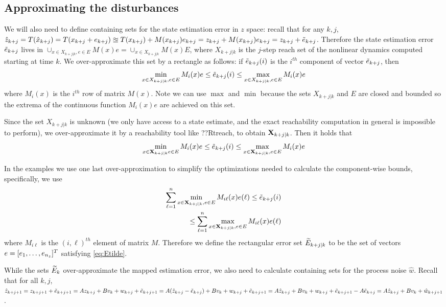 \subsection{Approximating the  disturbances}
\label{sec:approx dist}
We will also need to define containing sets for the state estimation error in $z$ space:
recall that for any $k,j$, 
$\hat{z}_{k+j} = T(\hat{x}_{k+j}) = T(x_{k+j} + e_{k+j}) \approxeq T(x_{k+j}) + M(x_{k+j})e_{k+j} = z_{k+j} + M(x_{k+j})e_{k+j} = z_{k+j} + \tilde{e}_{{k+j}}$.
Therefore the state estimation error $\tilde{e}_{k+j}$ lives in 
$\cup_{x\in X_{k+j|k}, e \in E}M(x)e = \cup_{x \in X_{k+j|k}}M(x)E$, 
where $X_{k+j|k}$ is the $j$-step reach set of the nonlinear dynamics computed starting at time $k$.
%
We over-approximate this set by a rectangle as follows: 
if $\tilde{e}_{k+j}(i)$ is the $i^{th}$ component of vector $\tilde{e}_{k+j}$, then 
\[\min_{x \in X_{k+j|k}, e \in E}M_i(x)e \leq \tilde{e}_{k+j}(i) \leq \max_{x \in X_{k+j|k}, e \in E} M_i(x)e\]
where $M_i(x)$ is the $i^{th}$ row of matrix $M(x)$.
Note we can use $\max$ and $\min$ because the sets $X_{k+j|k}$ and $E$ are closed and bounded so the extrema of the continuous function $M_i(x)e$ are achieved on this set.

Since the set $X_{k+j|k}$ is unknown (we only have access to a state estimate, and the exact reachability computation in general is impossible to perform), we over-approximate it by a reachability tool like ??Rtreach, to obtain $\mathbf{X}_{k+j|k}$.
Then it holds that 
\[\min_{x \in \mathbf{X}_{k+j|k} e \in E}M_i(x)e \leq \tilde{e}_{k+j}(i) \leq \max_{x \in \mathbf{X}_{k+j|k}, e \in E} M_i(x)e\]

In the examples we use one last over-approximation to simplify the optimizations needed to calculate the component-wise bounds, specifically, we use 
\begin{eqnarray}
\label{eq:Etilde}
\sum_{\ell=1}^{n} \min_{x \in \mathbf{X}_{k+j|k}, e \in E} M_{i\ell}(x)e(\ell)  \leq \tilde{e}_{k+j}(i) 
\nonumber 
\\
\leq \sum_{\ell=1}^{n} \max_{x \in \mathbf{X}_{k+j|k}, e \in E} M_{i\ell}(x)e(\ell)
\end{eqnarray}
where $M_{i\ell}$ is the $(i,\ell)^{th}$ element of matrix $M$.
Therefore we define the rectangular error set $\widetilde{E}_{k+j|k}$ to be the set of vectors $e = [e_1,\ldots, e_{n_z}]^T$ satisfying \eqref{eq:Etilde}.

While the sets $\widetilde{E}_{k}$ over-approximate the mapped estimation error, we also need to calculate containing sets for the process noise $\hat{w}$.
Recall that for all $k,j$, 
$\hat{z}_{k+j+1} = z_{k+j+1} + \tilde{e}_{k+j+1} = Az_{k+j}+Bv_k+w_{k+j} + \tilde{e}_{k+j+1} =  A(\hat{z}_{k+j} - \tilde{e}_{k+j}) + Bv_k + w_{k+j} + \tilde{e}_{k+j+1} = A\hat{z}_{k+j} + Bv_k + w_{k+j} + \tilde{e}_{k+j+1} - A \tilde{e}_{k+j} = A\hat{z}_{k+j} + Bv_k + \hat{w}_{k+j+1}$.

